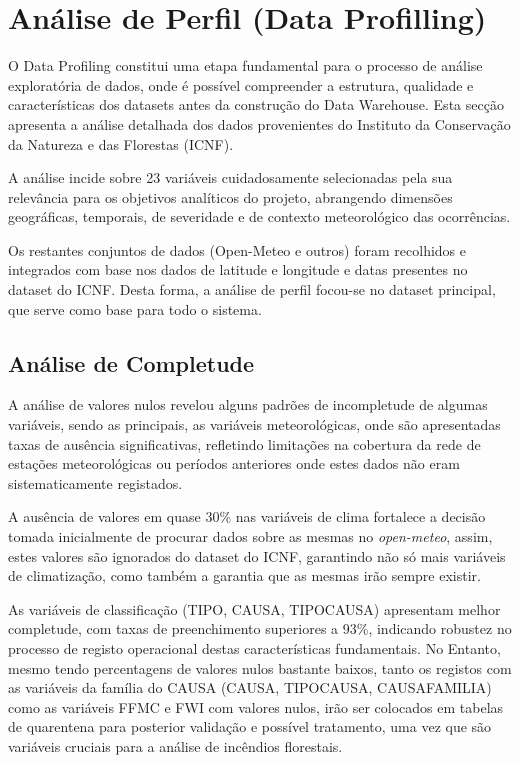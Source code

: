 \section{Análise de Perfil (Data Profilling)}
O Data Profiling constitui uma etapa fundamental para o processo de análise exploratória de dados, onde é possível compreender a estrutura, qualidade e características dos datasets antes da construção do Data Warehouse. Esta secção apresenta a análise detalhada dos dados provenientes do Instituto da Conservação da Natureza e das Florestas (ICNF).

A análise incide sobre 23 variáveis cuidadosamente selecionadas pela sua relevância para os objetivos analíticos do projeto, abrangendo dimensões geográficas, temporais, de severidade e de contexto meteorológico das ocorrências.

Os restantes conjuntos de dados (Open-Meteo e outros) foram recolhidos e integrados com base nos dados de latitude e longitude e datas presentes no dataset do ICNF. Desta forma, a análise de perfil focou-se no dataset principal, que serve como base para todo o sistema.

\subsection{Análise de Completude}
A análise de valores nulos revelou alguns padrões de incompletude de algumas variáveis, sendo as principais, as variáveis meteorológicas, onde são apresentadas taxas de ausência significativas, refletindo limitações na cobertura da rede de estações meteorológicas ou períodos anteriores onde estes dados não eram sistematicamente registados.

A ausência de valores em quase 30\% nas variáveis de clima fortalece a decisão tomada inicialmente de procurar dados sobre as mesmas no \textit{open-meteo}, assim, estes valores são ignorados do dataset do ICNF, garantindo não só mais variáveis de climatização, como também a garantia que as mesmas irão sempre existir.

As variáveis de classificação (TIPO, CAUSA, TIPOCAUSA) apresentam melhor completude, com taxas de preenchimento superiores a 93\%, indicando robustez no processo de registo operacional destas características fundamentais.
No Entanto, mesmo tendo percentagens de valores nulos bastante baixos, tanto os registos com as variáveis da família do CAUSA (CAUSA, TIPOCAUSA, CAUSAFAMILIA) como as variáveis FFMC e FWI com valores nulos, irão ser colocados em tabelas de quarentena para posterior validação e possível tratamento, uma vez que são variáveis cruciais para a análise de incêndios florestais.

